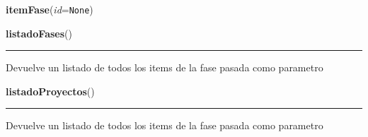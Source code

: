     \label{app:vista:vistaItem:itemFase}

    \vspace{0.5ex}

\hspace{.8\funcindent}\begin{boxedminipage}{\funcwidth}

    \raggedright \textbf{itemFase}(\textit{id}={\tt None})

\setlength{\parskip}{2ex}
\setlength{\parskip}{1ex}
    \end{boxedminipage}

    \label{app:vista:vistaItem:listadoFases}

    \vspace{0.5ex}

\hspace{.8\funcindent}\begin{boxedminipage}{\funcwidth}

    \raggedright \textbf{listadoFases}()

    \vspace{-1.5ex}

    \rule{\textwidth}{0.5\fboxrule}
\setlength{\parskip}{2ex}
    Devuelve un listado de todos los items de la fase pasada como parametro

\setlength{\parskip}{1ex}
    \end{boxedminipage}

    \label{app:vista:vistaItem:listadoProyectos}

    \vspace{0.5ex}

\hspace{.8\funcindent}\begin{boxedminipage}{\funcwidth}

    \raggedright \textbf{listadoProyectos}()

    \vspace{-1.5ex}

    \rule{\textwidth}{0.5\fboxrule}
\setlength{\parskip}{2ex}
    Devuelve un listado de todos los items de la fase pasada como parametro

\setlength{\parskip}{1ex}
    \end{boxedminipage}

